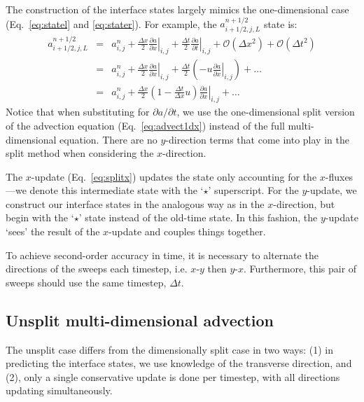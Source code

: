 \documentclass[11pt]{article}
\begin{document}
The construction of the interface states largely mimics the one-dimensional
case (Eq.~\ref{eq:statel} and \ref{eq:stater}).  For example, the
$a_{i+1/2,j,L}^{n+1/2}$ state is:
\begin{eqnarray}
a_{i+1/2,j,L}^{n+1/2} &=& a_{i,j}^n + 
  \frac{\Delta x}{2} \left .\frac{\partial a}{\partial x} \right |_{i,j} + 
  \frac{\Delta t}{2} \left .\frac{\partial a}{\partial t} \right |_{i,j} + 
  \mathcal{O}(\Delta x^2) + \mathcal{O}(\Delta t^2) \nonumber \\
 &=& a_{i,j}^n + 
   \frac{\Delta x}{2} \left .\frac{\partial a}{\partial x} \right |_{i,j} + 
   \frac{\Delta t}{2} \left ( 
   - u \left .\frac{\partial a}{\partial x} \right |_{i,j} \right
   ) + \ldots \nonumber \\
    &=& a_{i,j}^n + 
   \frac{\Delta x}{2} \left ( 1 - \frac{\Delta t}{\Delta x} u \right ) 
   \left .\frac{\partial a}{\partial x} \right |_{i,j} +
   \ldots \label{eq:statels}
\end{eqnarray}
Notice that when substituting for $\partial a / \partial t$, we use
the one-dimensional split version of the advection equation
(Eq.~\ref{eq:advect1dx}) instead of the full multi-dimensional
equation.  There are no $y$-direction terms that come into play in the
split method when considering the $x$-direction.

The $x$-update
(Eq.~\ref{eq:splitx}) updates the state only accounting for the
$x$-fluxes---we denote this intermediate state with the `$\star$'
superscript.  For the $y$-update, we construct our interface states in
the analogous way as in the $x$-direction, but begin with the `$\star$'
state instead of the old-time state.  In this fashion, the $y$-update
`sees' the result of the $x$-update and couples things together.

To achieve second-order accuracy in time, it is necessary to alternate
the directions of the sweeps each timestep, i.e. $x$-$y$ then $y$-$x$.
Furthermore, this pair of sweeps should use the same timestep, $\Delta t$.


\subsection{Unsplit multi-dimensional advection}

The unsplit case differs from the dimensionally split case in two ways:
(1) in predicting the interface states, we use knowledge of the transverse
direction, and (2), only a single conservative update is done per timestep,
with all directions updating simultaneously.
\end{document}
